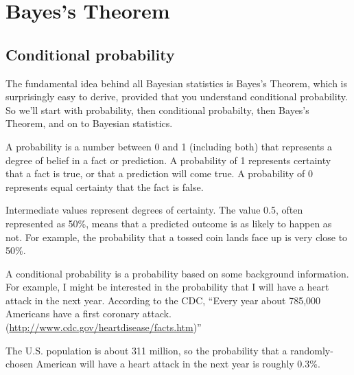 \documentclass[12pt]{book}
\begin{document}
\normalsize

\clearemptydoublepage

\begin{latexonly}

\tableofcontents

\clearemptydoublepage

\end{latexonly}

\mainmatter

\newcommand{\p}[1]{\ensuremath{\mathrm{p}(#1)}}
\renewcommand{\o}[1]{\ensuremath{\mathrm{o}(#1)}}
\newcommand{\T}[1]{\mbox{#1}}
\newcommand{\AND}{~\mathrm{and}~}
\newcommand{\NOT}{\mathrm{not}~}


\chapter{Bayes's Theorem}
\label{intro}

\section{Conditional probability}

The fundamental idea behind all Bayesian statistics is Bayes's Theorem,
which is surprisingly easy to derive, provided that you understand
conditional probability.  So we'll start with probability, then
conditional probabilty, then Bayes's Theorem, and on to Bayesian
statistics.

A probability is a number between 0 and 1 (including both) that
represents a degree of belief in a fact or prediction.  A probability
of 1 represents certainty that a fact is true, or that a prediction
will come true.  A probability of 0 represents equal certainty
that the fact is false.

Intermediate values represent degrees of certainty.  The value 0.5,
often represented as 50\%, means that a predicted outcome is
as likely to happen as not.  For example, the probability that a tossed
coin lands face up is very close to 50\%.

A conditional probability is a probability based on some background
information.  For example, I might be interested in the probability
that I will have a heart attack in the next year.  According to the
CDC, ``Every year about 785,000 Americans have a first coronary attack.
(\url{http://www.cdc.gov/heartdisease/facts.htm})''

The U.S. population is about 311 million, so the probability that a
randomly-chosen American will have a heart attack in the next year is
roughly 0.3\%.
\end{document}

